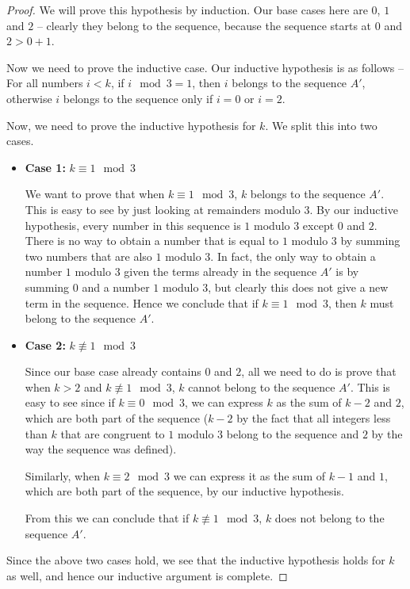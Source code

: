 \documentclass[11pt,letterpaper,twoside,english]{article}
\theoremstyle{theorem}
\theoremstyle{remark}
\begin{document}
\begin{proof}
We will prove this hypothesis by induction.
Our base cases here are $0$, $1$ and $2$ -- clearly they belong to the sequence, because the sequence starts at $0$ and $2 > 0 + 1$.

Now we need to prove the inductive case. Our inductive hypothesis is as follows -- For all numbers $i < k$, if $i \mod 3 = 1$, then $i$ belongs to the sequence $A'$, otherwise $i$ belongs to the sequence only if $i = 0$ or $i = 2$.

Now, we need to prove the inductive hypothesis for $k$. We split this into two cases.

\begin{itemize}

\item \textbf{Case 1:} $k \equiv 1 \mod 3$

We want to prove that when $k \equiv 1 \mod 3$, $k$ belongs to the sequence $A'$. This is easy to see by just looking at remainders modulo 3. By our inductive hypothesis, every number in this sequence is $1$ modulo $3$ except $0$ and $2$. There is no way to obtain a number that is equal to $1$ modulo $3$ by summing two numbers that are also $1$ modulo $3$. In fact, the only way to obtain a number $1$ modulo $3$ given the terms already in the sequence $A'$ is by summing $0$ and a number $1$ modulo $3$, but clearly this does not give a new term in the sequence. Hence we conclude that if $k \equiv 1 \mod 3$, then $k$ must belong to the sequence $A'$.

\item \textbf{Case 2:} $k \not \equiv 1 \mod 3$

Since our base case already contains $0$ and $2$, all we need to do is prove that when $k > 2$ and $k \not \equiv 1 \mod 3$, $k$ cannot belong to the sequence $A'$. This is easy to see since if $k \equiv 0 \mod 3$, we can express $k$ as the sum of $k - 2$ and $2$, which are both part of the sequence ($k - 2$ by the fact that all integers less than $k$ that are congruent to $1$ modulo $3$ belong to the sequence and $2$ by the way the sequence was defined).

Similarly, when $k \equiv 2 \mod 3$ we can express it as the sum of $k -1 $ and $1$, which are both part of the sequence, by our inductive hypothesis.

From this we can conclude that if $k \not \equiv 1 \mod 3$, $k$ does not belong to the sequence $A'$.

\end{itemize}

Since the above two cases hold, we see that the inductive hypothesis holds for $k$ as well, and hence our inductive argument is complete.

\end{proof}
\end{document}
